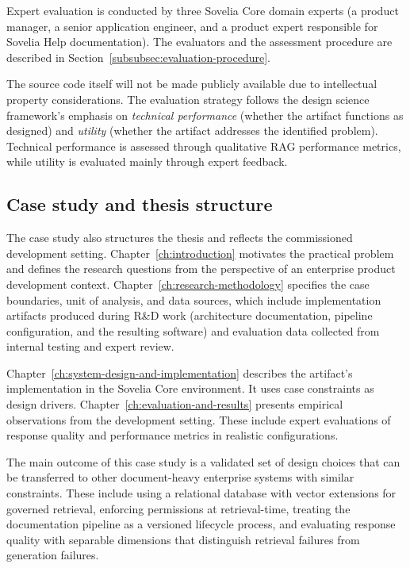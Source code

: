 Expert evaluation is conducted by three Sovelia Core domain experts (a product manager, a senior application engineer, and a product expert responsible for Sovelia Help documentation). The evaluators and the assessment procedure are described in Section~\ref{subsubsec:evaluation-procedure}.

The source code itself will not be made publicly available due to intellectual property considerations. The evaluation strategy follows the design science framework's emphasis on \textit{technical performance} (whether the artifact functions as designed) and \textit{utility} (whether the artifact addresses the identified problem). Technical performance is assessed through qualitative RAG performance metrics, while utility is evaluated mainly through expert feedback.

\subsection{Case study and thesis structure}
\label{subsec:case-study-connection}

The case study also structures the thesis and reflects the commissioned development setting. Chapter~\ref{ch:introduction} motivates the practical problem and defines the research questions from the perspective of an enterprise product development context. Chapter~\ref{ch:research-methodology} specifies the case boundaries, unit of analysis, and data sources, which include implementation artifacts produced during R\&D work (architecture documentation, pipeline configuration, and the resulting software) and evaluation data collected from internal testing and expert review.

Chapter~\ref{ch:system-design-and-implementation} describes the artifact's implementation in the Sovelia Core environment. It uses case constraints as design drivers. Chapter~\ref{ch:evaluation-and-results} presents empirical observations from the development setting. These include expert evaluations of response quality and performance metrics in realistic configurations.

The main outcome of this case study is a validated set of design choices that can be transferred to other document-heavy enterprise systems with similar constraints. These include using a relational database with vector extensions for governed retrieval, enforcing permissions at retrieval-time, treating the documentation pipeline as a versioned lifecycle process, and evaluating response quality with separable dimensions that distinguish retrieval failures from generation failures.
